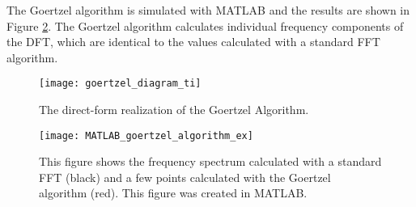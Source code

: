 The Goertzel algorithm is simulated with MATLAB and the results are shown in Figure \ref{fig:MATLAB_goertzel_algorithm_ex}.  The Goertzel algorithm calculates individual frequency components of the DFT, which are identical to the values calculated with a standard FFT algorithm.

\begin{figure}
	\centering
	\texttt{[image: goertzel\_diagram\_ti]}
	\decoRule
	\caption{The direct-form realization of the Goertzel Algorithm\cite{TI_goertzel}.}
	\label{fig:goertzel_diagram_ti}
\end{figure}

\begin{figure}
	\centering
	\texttt{[image: MATLAB\_goertzel\_algorithm\_ex]}
	\decoRule
	\caption{This figure shows the frequency spectrum calculated with a standard FFT (black) and a few points calculated with the Goertzel algorithm (red).  This figure was created in MATLAB.}
	\label{fig:MATLAB_goertzel_algorithm_ex}
\end{figure}
